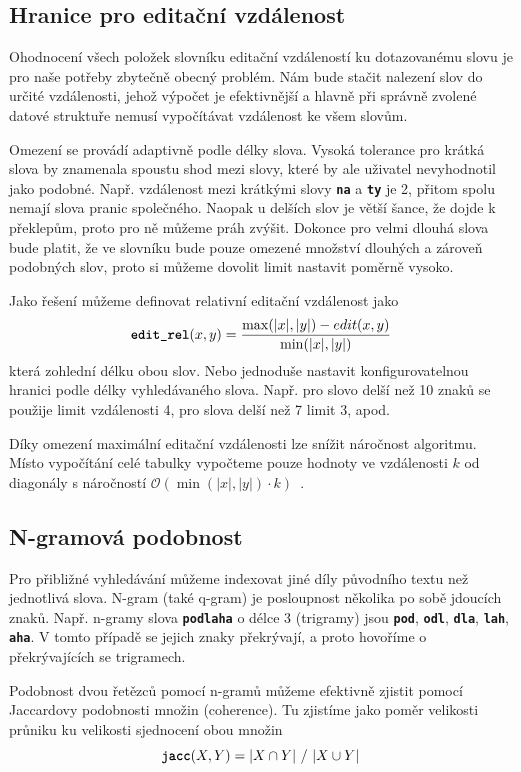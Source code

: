 \documentclass[11pt,letterpaper,oneside,openright]{book}
\newcommand{\bftt}[1]{\texttt{\textbf{#1}}}
\begin{document}
\subsection{Hranice pro editační vzdálenost}
Ohodnocení všech položek slovníku editační vzdáleností ku dotazovanému slovu je
pro naše potřeby zbytečně obecný problém. Nám bude stačit nalezení slov do
určité vzdálenosti, jehož výpočet je efektivnější a hlavně při správně zvolené
datové struktuře nemusí vypočítávat vzdálenost ke všem slovům.

Omezení se provádí adaptivně podle délky slova. Vysoká tolerance pro krátká
slova by znamenala spoustu shod mezi slovy, které by ale uživatel nevyhodnotil
jako podobné. Např. vzdálenost mezi krátkými slovy \bftt{na} a \bftt{ty} je 2,
přitom spolu nemají slova pranic společného. Naopak u delších slov je větší
šance, že dojde k překlepům, proto pro ně můžeme práh zvýšit. Dokonce pro velmi
dlouhá slova bude platit, že ve slovníku bude pouze omezené množství dlouhých a
zároveň podobných slov, proto si můžeme dovolit limit nastavit poměrně vysoko.

Jako řešení můžeme definovat relativní editační vzdálenost jako
\[\bftt{edit\_rel}(x, y) = \frac{\max (|x|, |y|) - edit(x, y)}{\min (|x|,
|y|)}\]
která zohlední délku obou slov. Nebo jednoduše nastavit konfigurovatelnou
hranici podle délky vyhledávaného slova. Např. pro slovo delší než 10 znaků se
použije limit vzdálenosti 4, pro slova delší než 7 limit 3, apod.

Díky omezení maximální editační vzdálenosti lze snížit náročnost algoritmu.
Místo vypočítání celé tabulky vypočteme pouze hodnoty ve vzdálenosti $k$ od
diagonály s náročností $\mathcal{O}(\min (|x|, |y|) \cdot
k)$~\cite{Ukkonen:1985:AAS:4620.4626}.


\subsection{N-gramová podobnost}
Pro přibližné vyhledávání můžeme indexovat jiné díly původního textu než
jednotlivá slova. N-gram (také q-gram) je posloupnost několika po sobě jdoucích
znaků. Např. n-gramy slova \bftt{podlaha} o délce 3 (trigramy) jsou \bftt{pod},
\bftt{odl}, \bftt{dla}, \bftt{lah}, \bftt{aha}. V tomto případě se jejich znaky
překrývají, a proto hovoříme o překrývajících se trigramech.

Podobnost dvou řetězců pomocí n-gramů můžeme efektivně zjistit pomocí
Jaccardovy podobnosti množin (coherence). Tu zjistíme jako poměr velikosti
průniku ku velikosti sjednocení obou množin~\cite{Rajaraman:2011:MMD:2124405}
\[\bftt{jacc}(X, Y) = |X \cap Y|\ /\ |X \cup Y|\]
\end{document}
